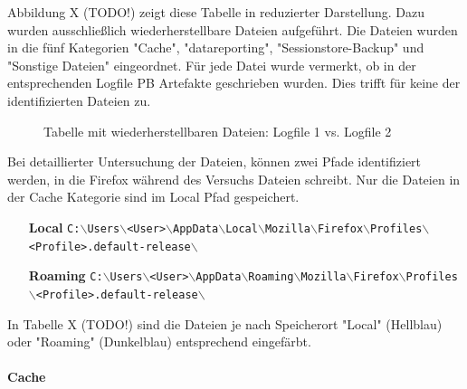 Abbildung X (TODO!) zeigt diese Tabelle in reduzierter Darstellung.
Dazu wurden ausschließlich wiederherstellbare Dateien aufgeführt. 
Die Dateien wurden in die fünf Kategorien "Cache", "datareporting", "Sessionstore-Backup" und "Sonstige Dateien" eingeordnet.
Für jede Datei wurde vermerkt, ob in der entsprechenden Logfile PB Artefakte geschrieben wurden.
Dies trifft für keine der identifizierten Dateien zu.
\begin{figure}[h!]
	\caption{Tabelle mit wiederherstellbaren Dateien: Logfile 1 vs. Logfile 2}
\end{figure}

Bei detaillierter Untersuchung der Dateien, können zwei Pfade identifiziert werden, in die Firefox während des Versuchs Dateien schreibt. Nur die Dateien in der Cache Kategorie sind im Local Pfad gespeichert.
\begin{itemize}
\item[\textbf{Local}] \texttt{C:$\backslash$Users$\backslash$<User>$\backslash$AppData$\backslash$Local$\backslash$Mozilla$\backslash$Firefox$\backslash$Profiles$\backslash$<Profile>.default-release$\backslash$}
\item[\textbf{Roaming}] \texttt{C:$\backslash$Users$\backslash$<User>$\backslash$AppData$\backslash$Roaming$\backslash$Mozilla$\backslash$Firefox$\backslash$Profiles$\backslash$<Profile>.default-release$\backslash$}
\end{itemize}
In Tabelle X (TODO!) sind die Dateien je nach Speicherort "Local" (Hellblau) oder "Roaming" (Dunkelblau) entsprechend eingefärbt. 

\paragraph*{Cache}

